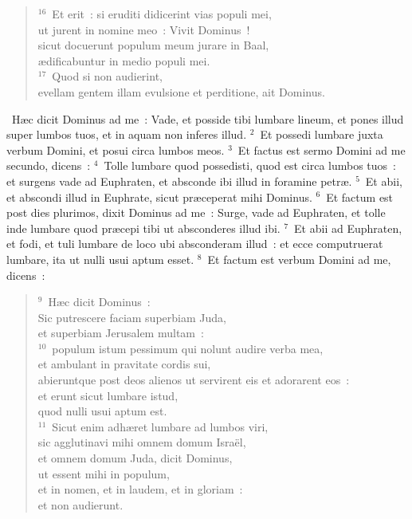 \begin{flushleft}
\begin{verse}
${}^{16}$~Et erit~: si eruditi didicerint vias populi mei,\\ ut jurent in nomine meo~: Vivit Dominus~!\\ sicut docuerunt populum meum jurare in Baal,\\ \ae dificabuntur in medio populi mei.\\
${}^{17}$~Quod si non audierint,\\ evellam gentem illam evulsione et perditione, ait Dominus.\end{verse}\end{flushleft}


~H\ae c dicit Dominus ad me~: Vade, et posside tibi lumbare lineum, et pones illud super lumbos tuos, et in aquam non inferes illud.
${}^{2}$~Et possedi lumbare juxta verbum Domini, et posui circa lumbos meos.
${}^{3}$~Et factus est sermo Domini ad me secundo, dicens~:
${}^{4}$~Tolle lumbare quod possedisti, quod est circa lumbos tuos~: et surgens vade ad Euphraten, et absconde ibi illud in foramine petr\ae .
${}^{5}$~Et abii, et abscondi illud in Euphrate, sicut pr\ae ceperat mihi Dominus.
${}^{6}$~Et factum est post dies plurimos, dixit Dominus ad me~: Surge, vade ad Euphraten, et tolle inde lumbare quod pr\ae cepi tibi ut absconderes illud ibi.
${}^{7}$~Et abii ad Euphraten, et fodi, et tuli lumbare de loco ubi absconderam illud~: et ecce computruerat lumbare, ita ut nulli usui aptum esset.
${}^{8}$~Et factum est verbum Domini ad me, dicens~:
\begin{flushleft}\begin{verse}${}^{9}$~H\ae c dicit Dominus~:\\ Sic putrescere faciam superbiam Juda,\\ et superbiam Jerusalem multam~:\\
${}^{10}$~populum istum pessimum qui nolunt audire verba mea,\\ et ambulant in pravitate cordis sui,\\ abieruntque post deos alienos ut servirent eis et adorarent eos~:\\ et erunt sicut lumbare istud,\\ quod nulli usui aptum est.\\
${}^{11}$~Sicut enim adh\ae ret lumbare ad lumbos viri,\\ sic agglutinavi mihi omnem domum Isra\"el,\\ et omnem domum Juda, dicit Dominus,\\ ut essent mihi in populum,\\ et in nomen, et in laudem, et in gloriam~:\\ et non audierunt.\end{verse}\end{flushleft}


